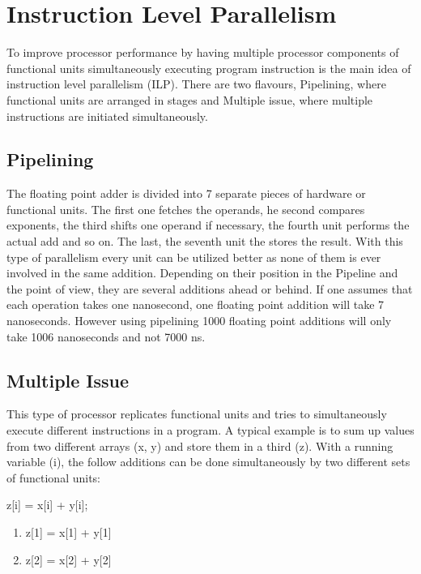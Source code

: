 \documentclass{article}
\begin{document}
\section{Instruction Level Parallelism} %
\label{sec:instruction_level_parallelism}
To improve processor performance by having multiple processor components of functional units simultaneously executing program instruction is the main idea of instruction level parallelism (ILP). There are two flavours, Pipelining, where functional units are arranged in stages and Multiple issue, where multiple instructions are initiated simultaneously.

\subsection{Pipelining} %
\label{sub:pipelining}
	The floating point adder is divided into 7 separate pieces of hardware or functional units.
	The first one fetches the operands, 
	he second compares exponents,
	the third shifts one operand if necessary,
	the fourth unit performs the actual add and so on.
	The last, the seventh unit the stores the result.
	With this type of parallelism every unit can be utilized better
	as none of them is ever involved in the same addition.
	Depending on their position in the Pipeline and the point of view,
	they are several additions ahead or behind.
	If one assumes that each operation takes one nanosecond,
	one floating point addition will take 7 nanoseconds.
	However using pipelining 1000 floating point additions will only take 1006 nanoseconds
	and not 7000 ns.

\subsection{Multiple Issue} %
\label{sub:multiple_issue}
	This type of processor replicates functional units
	and tries to simultaneously execute different instructions in a program.
	A typical example is to sum up values from two different arrays (x, y)
	and store them in a third (z).
	With a running variable (i),
	the follow additions can be done simultaneously by two different sets of functional units:\\
	\begin{center}
		z[i] = x[i] + y[i];
		\begin{enumerate}
			\item z[1] = x[1] + y[1]
			\item z[2] = x[2] + y[2]
		\end{enumerate}
	\end{center}
\end{document}
